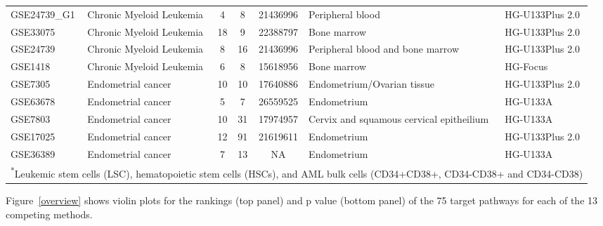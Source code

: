 \documentclass[Minh_PhD_thesis.tex]{subfiles}
\begin{document}
\begin{landscape}
\begin{longtable}{lp{4cm}cccp{4cm}l}
GSE24739\_G1	&Chronic Myeloid Leukemia	&4	&8	&21436996	&Peripheral blood	&HG-U133Plus 2.0 \\
GSE33075	&Chronic Myeloid Leukemia	&18	&9	&22388797	&Bone marrow	&HG-U133Plus 2.0 \\
GSE24739	&Chronic Myeloid Leukemia	&8	&16	&21436996	&Peripheral blood and bone marrow	&HG-U133Plus 2.0\\
GSE1418	&Chronic Myeloid Leukemia	&6	&8	&15618956	&Bone marrow	&HG-Focus\\
GSE7305	&Endometrial cancer	&10	&10	&17640886	&Endometrium/Ovarian tissue	&HG-U133Plus 2.0\\
GSE63678	&Endometrial cancer	&5	&7	&26559525	&Endometrium	&HG-U133A\\
GSE7803	&Endometrial cancer	&10	&31	&17974957	&Cervix and squamous cervical epitheilium	&HG-U133A\\
GSE17025	&Endometrial cancer	&12	&91	&21619611	&Endometrium	&HG-U133Plus 2.0\\
GSE36389	&Endometrial cancer	&7	&13	&NA	&Endometrium	&HG-U133A\\
\hline
\multicolumn{7}{l}{\textsuperscript{*}\footnotesize{Leukemic stem cells (LSC), hematopoietic stem cells (HSCs), and AML bulk cells (CD34+CD38+, CD34-CD38+ and CD34-CD38)}}
\label{table:HumanDatasets}
\end{longtable}
\end{landscape}


Figure~\ref{overview} shows violin plots for the rankings (top panel) and p value (bottom panel) of the 75 target pathways for each of the 13 competing methods. 
\end{document}
